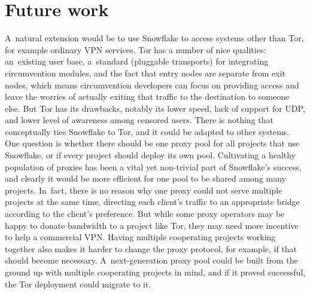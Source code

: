 \documentclass[letterpaper,twocolumn]{article}
\begin{document}
\section{Future work}
\label{sec:future}

A~natural extension would be to use Snowflake
to access systems other than Tor,
for example ordinary VPN services.
Tor has a number of nice qualities:
an~existing user base,
a~standard (pluggable transports) for integrating
circumvention modules,
and the fact that entry nodes are separate from exit nodes,
which means circumvention developers can focus on providing access
and leave the worries of actually exiting that traffic
to the destination to someone else.
But Tor has its drawbacks,
notably its lower speed,
lack of support for UDP,
and lower level of awareness among censored users.
There is nothing that conceptually ties Snowflake to Tor,
and it could be adapted to other systems.
One question is whether there should be one proxy pool
for all projects that use Snowflake,
or if every project should deploy its own pool.
Cultivating a healthy population of proxies
has been a vital yet non-trivial part of Snowflake's success,
and clearly it would be more efficient for one pool
to be shared among many projects.
In~fact, there is no reason why one proxy could not
serve multiple projects at the same time,
directing each client's traffic to an appropriate bridge
according to the client's preference.
But while some proxy operators may be happy to donate
bandwidth to a project like Tor,
they may need more incentive to help a commercial VPN.
Having multiple cooperating projects
working together also makes it harder
to change the proxy protocol, for example,
if that should become necessary.
A~next-generation proxy pool could be built
from the ground up with multiple cooperating projects in mind,
and if it proved successful,
the Tor deployment could migrate to it.
\end{document}

